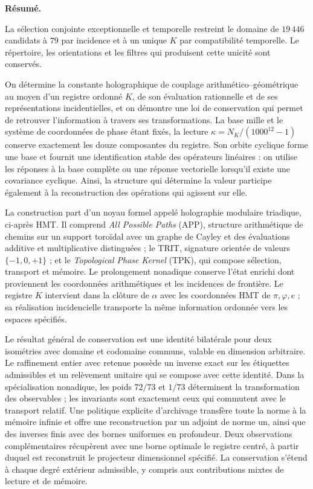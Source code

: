 \noindent\textbf{Résumé.}
\par\smallskip
La sélection conjointe exceptionnelle et temporelle restreint le domaine de \(19\,446\) candidats à \(79\) par incidence et à un unique \(K\) par compatibilité temporelle. Le répertoire, les orientations et les filtres qui produisent cette unicité sont conservés.


On détermine la constante holographique de couplage arithmético--géométrique au moyen d’un registre ordonné \(K\), de son évaluation rationnelle et de ses représentations incidentielles, et on démontre une loi de conservation qui permet de retrouver l’information à travers ses transformations. La base mille et le système de coordonnées de phase étant fixés, la lecture \(\kappa=N_K/(1000^{12}-1)\) conserve exactement les douze composantes du registre. Son orbite cyclique forme une base et fournit une identification stable des opérateurs linéaires : on utilise les réponses à la base complète ou une réponse vectorielle lorsqu’il existe une covariance cyclique. Ainsi, la structure qui détermine la valeur participe également à la reconstruction des opérations qui agissent sur elle.

La construction part d’un noyau formel appelé holographie modulaire triadique, ci-après HMT. Il comprend \emph{All Possible Paths} (APP), structure arithmétique de chemins sur un support toroïdal avec un graphe de Cayley et des évaluations additive et multiplicative distinguées ; le TRIT, signature orientée de valeurs \(\{-1,0,+1\}\) ; et le \emph{Topological Phase Kernel} (TPK), qui compose sélection, transport et mémoire. Le prolongement nonadique conserve l’état enrichi dont proviennent les coordonnées arithmétiques et les incidences de frontière. Le registre \(K\) intervient dans la clôture de \(\alpha\) avec les coordonnées HMT de \(\pi,\varphi,e\) ; sa réalisation incidencielle transporte la même information ordonnée vers les espaces spécifiés.

Le résultat général de conservation est une identité bilatérale pour deux isométries avec domaine et codomaine communs, valable en dimension arbitraire. Le raffinement entier avec retenue possède un inverse exact sur les étiquettes admissibles et un relèvement unitaire qui se compose avec cette identité. Dans la spécialisation nonadique, les poids \(72/73\) et \(1/73\) déterminent la transformation des observables ; les invariants sont exactement ceux qui commutent avec le transport relatif. Une politique explicite d'archivage transfère toute la norme à la mémoire infinie et offre une reconstruction par un adjoint de norme un, ainsi que des inverses finis avec des bornes uniformes en profondeur. Deux observations complémentaires récupèrent avec une borne optimale le registre centré, à partir duquel est reconstruit le projecteur dimensionnel spécifié. La conservation s'étend à chaque degré extérieur admissible, y compris aux contributions mixtes de lecture et de mémoire.

